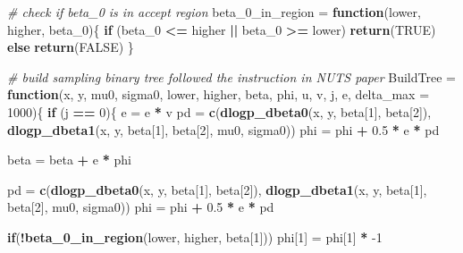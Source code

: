 \documentclass[
]{article}
\newenvironment{Shaded}{\begin{snugshade}}{\end{snugshade}}
\newcommand{\CommentTok}[1]{\textcolor[rgb]{0.56,0.35,0.01}{\textit{#1}}}
\newcommand{\ControlFlowTok}[1]{\textcolor[rgb]{0.13,0.29,0.53}{\textbf{#1}}}
\newcommand{\DataTypeTok}[1]{\textcolor[rgb]{0.13,0.29,0.53}{#1}}
\newcommand{\DecValTok}[1]{\textcolor[rgb]{0.00,0.00,0.81}{#1}}
\newcommand{\FloatTok}[1]{\textcolor[rgb]{0.00,0.00,0.81}{#1}}
\newcommand{\KeywordTok}[1]{\textcolor[rgb]{0.13,0.29,0.53}{\textbf{#1}}}
\newcommand{\NormalTok}[1]{#1}
\newcommand{\OperatorTok}[1]{\textcolor[rgb]{0.81,0.36,0.00}{\textbf{#1}}}
\newcommand{\OtherTok}[1]{\textcolor[rgb]{0.56,0.35,0.01}{#1}}
\newcommand{\StringTok}[1]{\textcolor[rgb]{0.31,0.60,0.02}{#1}}
\begin{document}
\begin{Shaded}
\begin{Highlighting}[]
\CommentTok{# check if beta_0 is in accept region}
\NormalTok{beta_}\DecValTok{0}\NormalTok{_in_region =}\StringTok{ }\ControlFlowTok{function}\NormalTok{(lower, higher, beta_}\DecValTok{0}\NormalTok{)\{}
  \ControlFlowTok{if}\NormalTok{ (beta_}\DecValTok{0} \OperatorTok{<=}\StringTok{ }\NormalTok{higher }\OperatorTok{||}\StringTok{ }\NormalTok{beta_}\DecValTok{0} \OperatorTok{>=}\StringTok{ }\NormalTok{lower)}
    \KeywordTok{return}\NormalTok{(}\OtherTok{TRUE}\NormalTok{)}
  \ControlFlowTok{else}
    \KeywordTok{return}\NormalTok{(}\OtherTok{FALSE}\NormalTok{)}
\NormalTok{\}}

\CommentTok{# build sampling binary tree followed the instruction in NUTS paper}
\NormalTok{BuildTree =}\StringTok{ }\ControlFlowTok{function}\NormalTok{(x, y, mu0, sigma0, lower, higher, beta, phi, u, v, j, e, }\DataTypeTok{delta_max =} \DecValTok{1000}\NormalTok{)\{}
  \ControlFlowTok{if}\NormalTok{ (j }\OperatorTok{==}\StringTok{ }\DecValTok{0}\NormalTok{)\{}
\NormalTok{    e =}\StringTok{ }\NormalTok{e }\OperatorTok{*}\StringTok{ }\NormalTok{v}
\NormalTok{    pd =}\StringTok{ }\KeywordTok{c}\NormalTok{(}\KeywordTok{dlogp_dbeta0}\NormalTok{(x, y, beta[}\DecValTok{1}\NormalTok{], beta[}\DecValTok{2}\NormalTok{]), }\KeywordTok{dlogp_dbeta1}\NormalTok{(x, y, beta[}\DecValTok{1}\NormalTok{], beta[}\DecValTok{2}\NormalTok{], mu0, sigma0))}
\NormalTok{    phi =}\StringTok{ }\NormalTok{phi }\OperatorTok{+}\StringTok{ }\FloatTok{0.5} \OperatorTok{*}\StringTok{ }\NormalTok{e }\OperatorTok{*}\StringTok{ }\NormalTok{pd}
    
\NormalTok{    beta =}\StringTok{ }\NormalTok{beta }\OperatorTok{+}\StringTok{ }\NormalTok{e }\OperatorTok{*}\StringTok{ }\NormalTok{phi}
    
\NormalTok{    pd =}\StringTok{ }\KeywordTok{c}\NormalTok{(}\KeywordTok{dlogp_dbeta0}\NormalTok{(x, y, beta[}\DecValTok{1}\NormalTok{], beta[}\DecValTok{2}\NormalTok{]), }\KeywordTok{dlogp_dbeta1}\NormalTok{(x, y, beta[}\DecValTok{1}\NormalTok{], beta[}\DecValTok{2}\NormalTok{], mu0, sigma0))}
\NormalTok{    phi =}\StringTok{ }\NormalTok{phi }\OperatorTok{+}\StringTok{ }\FloatTok{0.5} \OperatorTok{*}\StringTok{ }\NormalTok{e }\OperatorTok{*}\StringTok{ }\NormalTok{pd}
    
    
    \ControlFlowTok{if}\NormalTok{(}\OperatorTok{!}\KeywordTok{beta_0_in_region}\NormalTok{(lower, higher, beta[}\DecValTok{1}\NormalTok{]))}
\NormalTok{            phi[}\DecValTok{1}\NormalTok{] =}\StringTok{ }\NormalTok{phi[}\DecValTok{1}\NormalTok{] }\OperatorTok{*}\StringTok{ }\DecValTok{-1}
    

\end{Highlighting}
\end{Shaded}
\end{document}
